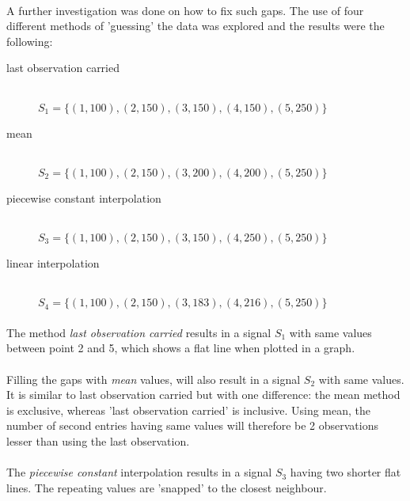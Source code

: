 \paragraph{}
A further investigation was done on how to fix such gaps. The use of four
different methods of 'guessing' the data was explored and the results were the
following:
\begin{description}
	\item[last observation carried] \hfill \\[1em]
	$S_{1} = \{(1,100), (2,150), (3,150), (4,150), (5,250)\}$

	\item[mean] \hfill \\[1em]
	$S_{2} = \{(1,100), (2,150), (3,200), (4,200), (5,250)\}$
	
	\item[piecewise constant interpolation] \hfill \\[1em]
	$S_{3} = \{(1,100), (2,150), (3,150), (4,250), (5,250)\}$
	
	\item[linear interpolation] \hfill \\[1em]
	$S_{4} = \{(1,100), (2,150), (3,183), (4,216), (5,250)\}$
\end{description}

\paragraph{}
The method \textit{last observation carried} results in a signal $S_{1}$ with
same values between point 2 and 5, which shows a flat line when plotted in a
graph.

\paragraph{}
Filling the gaps with \textit{mean} values, will also result in a signal
$S_{2}$ with same values. It is similar to last observation carried but with
one difference: the mean method is exclusive, whereas 'last observation
carried' is inclusive. Using mean, the number of second entries having same
values will therefore be 2 observations lesser than using the last observation.

\paragraph{}
The \textit{piecewise constant} interpolation results in a signal $S_{3}$
having two shorter flat lines. The repeating values are 'snapped' to the
closest neighbour.

